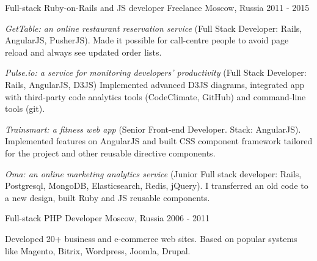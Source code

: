 


\begin{cventries}

  \cventry
    {Full-stack Ruby-on-Rails and JS developer} %
    {Freelance} %
    {Moscow, Russia} %
    {2011 - 2015} %
    {
      \begin{cvitems} %
        \item {\textit{GetTable: an online restaurant reservation service} (Full Stack Developer: Rails, AngularJS, PusherJS). Made it possible for call-centre people to avoid page reload and always see updated order lists.}
        \item {\textit{Pulse.io: a service for monitoring developers’ productivity} (Full Stack Developer: Rails, AngularJS, D3JS) Implemented advanced D3JS diagrams, integrated app with third-party code analytics tools (CodeClimate, GitHub) and command-line tools (git).}
        \item {\textit{Trainsmart: a fitness web app} (Senior Front-end Developer. Stack: AngularJS). Implemented features on AngularJS and built CSS component framework tailored for the project and other reusable directive components.}
        \item {\textit{Oma: an online marketing analytics service} (Junior Full stack developer: Rails, Postgresql, MongoDB, Elasticsearch, Redis, jQuery). I transferred an old code to a new design, built Ruby and JS reusable components.}
      \end{cvitems}
    }

  \cventry
    {Full-stack PHP Developer} %
    {} %
    {Moscow, Russia} %
    {2006 - 2011} %
    {
      \begin{cvitems} %
        \item {Developed 20+ business and e-commerce web sites. Based on popular systems like Magento, Bitrix, Wordpress, Joomla, Drupal.}
      \end{cvitems}
    }

\end{cventries}
